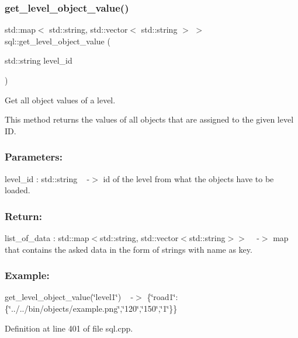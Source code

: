 \subsubsection{\texorpdfstring{get\+\_\+level\+\_\+object\+\_\+value()}{get\_level\_object\_value()}}
{\footnotesize\ttfamily std\+::map$<$ std\+::string, std\+::vector$<$ std\+::string $>$ $>$ sql\+::get\+\_\+level\+\_\+object\+\_\+value (\begin{DoxyParamCaption}\item[{std\+::string}]{level\+\_\+id }\end{DoxyParamCaption})}



Get all object values of a level. 

This method returns the values of all objects that are assigned to the given level ID.~\newline


\subsubsection*{Parameters\+: }

level\+\_\+id \+: std\+::string ~\newline
-\/$>$ id of the level from what the objects have to be loaded.

\subsubsection*{Return\+: }

list\+\_\+of\+\_\+data \+: std\+::map$<$std\+::string, std\+::vector$<$std\+::string$>$$>$ ~\newline
-\/$>$ map that contains the asked data in the form of strings with name as key.~\newline


\subsubsection*{Example\+: }

get\+\_\+level\+\_\+object\+\_\+value(\char`\"{}level1\char`\"{}) ~\newline
-\/$>$ \{\char`\"{}road1\char`\"{}\+:\{\char`\"{}../../bin/objects/example.\+png\char`\"{},\char`\"{}120\char`\"{},\char`\"{}150\char`\"{},\char`\"{}1\char`\"{}\}\} 

Definition at line 401 of file sql.\+cpp.

